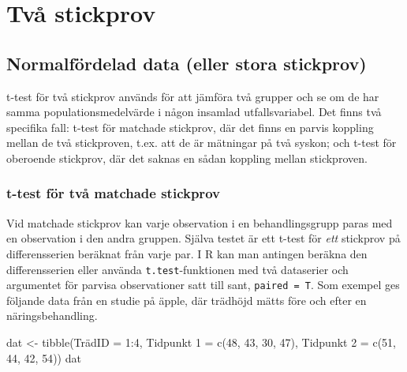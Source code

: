 \documentclass[
]{book}
\newenvironment{Shaded}{\begin{snugshade}}{\end{snugshade}}
\newcommand{\AttributeTok}[1]{\textcolor[rgb]{0.77,0.63,0.00}{#1}}
\newcommand{\DecValTok}[1]{\textcolor[rgb]{0.00,0.00,0.81}{#1}}
\newcommand{\FunctionTok}[1]{\textcolor[rgb]{0.00,0.00,0.00}{#1}}
\newcommand{\NormalTok}[1]{#1}
\newcommand{\OtherTok}[1]{\textcolor[rgb]{0.56,0.35,0.01}{#1}}
\newcommand{\SpecialCharTok}[1]{\textcolor[rgb]{0.00,0.00,0.00}{#1}}
\newcommand{\StringTok}[1]{\textcolor[rgb]{0.31,0.60,0.02}{#1}}
\theoremstyle{definition}
\theoremstyle{definition}
\theoremstyle{definition}
\theoremstyle{definition}
\theoremstyle{remark}
\begin{document}
\hypertarget{tvuxe5-stickprov}{%
\chapter{Två stickprov}\label{tvuxe5-stickprov}}

\hypertarget{normalfuxf6rdelad-data-eller-stora-stickprov-1}{%
\section{Normalfördelad data (eller stora stickprov)}\label{normalfuxf6rdelad-data-eller-stora-stickprov-1}}

t-test för två stickprov används för att jämföra två grupper och se om de har samma populationsmedelvärde i någon insamlad utfallsvariabel. Det finns två specifika fall: t-test för matchade stickprov, där det finns en parvis koppling mellan de två stickproven, t.ex. att de är mätningar på två syskon; och t-test för oberoende stickprov, där det saknas en sådan koppling mellan stickproven.

\hypertarget{t-test-fuxf6r-tvuxe5-matchade-stickprov}{%
\subsection{t-test för två matchade stickprov}\label{t-test-fuxf6r-tvuxe5-matchade-stickprov}}

Vid matchade stickprov kan varje observation i en behandlingsgrupp paras med en observation i den andra gruppen. Själva testet är ett t-test för \emph{ett} stickprov på differensserien beräknat från varje par. I R kan man antingen beräkna den differensserien eller använda \texttt{t.test}-funktionen med två dataserier och argumentet för parvisa observationer satt till sant, \texttt{paired\ =\ T}.
Som exempel ges följande data från en studie på äpple, där trädhöjd mätts före och efter en näringsbehandling.

\begin{Shaded}
\begin{Highlighting}[]
\NormalTok{dat }\OtherTok{\textless{}{-}} \FunctionTok{tibble}\NormalTok{(TrädID }\OtherTok{=} \DecValTok{1}\SpecialCharTok{:}\DecValTok{4}\NormalTok{, }
              \StringTok{\textasciigrave{}}\AttributeTok{Tidpunkt 1}\StringTok{\textasciigrave{}} \OtherTok{=} \FunctionTok{c}\NormalTok{(}\DecValTok{48}\NormalTok{, }\DecValTok{43}\NormalTok{, }\DecValTok{30}\NormalTok{, }\DecValTok{47}\NormalTok{), }
              \StringTok{\textasciigrave{}}\AttributeTok{Tidpunkt 2}\StringTok{\textasciigrave{}} \OtherTok{=} \FunctionTok{c}\NormalTok{(}\DecValTok{51}\NormalTok{, }\DecValTok{44}\NormalTok{, }\DecValTok{42}\NormalTok{, }\DecValTok{54}\NormalTok{))}
\NormalTok{dat}
\end{Highlighting}
\end{Shaded}
\end{document}
